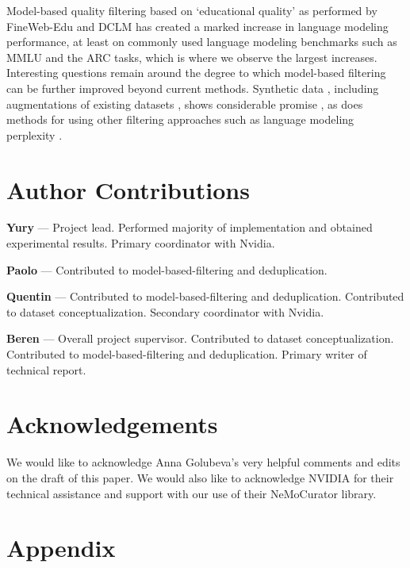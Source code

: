 \documentclass[conference]{IEEEtran}
\begin{document}
Model-based quality filtering based on `educational quality' as performed by FineWeb-Edu and DCLM has created a marked increase in language modeling performance, at least on commonly used language modeling benchmarks such as MMLU and the ARC tasks, which is where we observe the largest increases. Interesting questions remain around the degree to which model-based filtering can be further improved beyond current methods. Synthetic data \citep{abdin2024phi}, including augmentations of existing datasets \citep{maini2024rephrasing}, shows considerable promise \citep{maini2024rephrasing}, as does methods for using other filtering approaches such as language modeling perplexity \citep{ankner2024perplexed}. 


\clearpage

\section*{Author Contributions}

\textbf{Yury} — Project lead. Performed majority of implementation and obtained experimental results. Primary coordinator with Nvidia.

\textbf{Paolo} — Contributed to model-based-filtering and deduplication. 

\textbf{Quentin} — Contributed to model-based-filtering and deduplication. Contributed to dataset conceptualization. Secondary coordinator with Nvidia.


\textbf{Beren} — Overall project supervisor. Contributed to dataset conceptualization. Contributed to model-based-filtering and deduplication.  Primary writer of technical report. 


\section*{Acknowledgements}

We would like to acknowledge Anna Golubeva's very helpful comments and edits on the draft of this paper. We would also like to acknowledge NVIDIA for their technical assistance and support with our use of their NeMoCurator library.





\newpage


\clearpage
\section*{Appendix}
\end{document}
